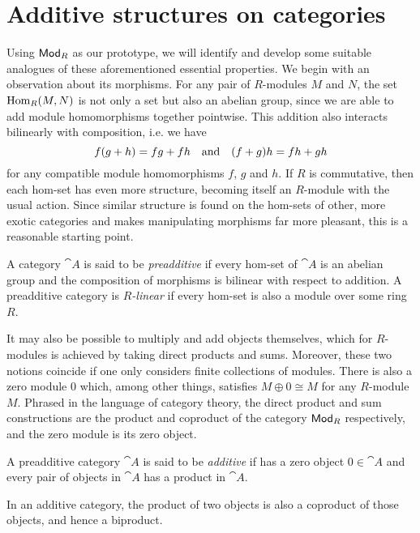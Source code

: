 \section{Additive structures on categories}

Using ${\mathsf{Mod}}_{{R}}$ as our prototype, we will identify and develop some
suitable analogues of these aforementioned essential properties.
We begin with an observation about its morphisms.
For any pair of $R$-modules $M$ and $N$, the set $\operatorname{Hom}_R(M, N)$ is
not only a set but also an abelian group, since we are able to add
module homomorphisms together pointwise.
This addition also interacts bilinearly with composition, i.e. we have
\[
  f(g + h) = fg + fh
  \quad \text{and} \quad
  (f + g)h = fh + gh
\]
for any compatible module homomorphisms $f$, $g$ and $h$.
If $R$ is commutative, then each hom-set has even more structure,
becoming itself an $R$-module with the usual action.
Since similar structure is found on the hom-sets of other, more
exotic categories and makes manipulating morphisms far more pleasant,
this is a reasonable starting point.

\begin{definition}
  A category $\cat{A}$ is said to be \emph{preadditive} if every
  hom-set of $\cat{A}$ is an abelian group and the composition of
  morphisms is bilinear with respect to addition.
  A preadditive category is \emph{$R$-linear} if every hom-set is
  also a module over some ring $R$.
\end{definition}

It may also be possible to multiply and add objects themselves, which
for $R$-modules is achieved by taking direct products and sums.
Moreover, these two notions coincide if one only considers finite
collections of modules.
There is also a zero module $0$ which, among other things, satisfies
$M \oplus 0 \cong M$ for any $R$-module $M$.
Phrased in the language of category theory, the direct product and
sum constructions are the product and coproduct of the category
${\mathsf{Mod}}_{{R}}$ respectively, and the zero module is its zero object.

\begin{definition}
  \label{def_additive_cat}
  A preadditive category $\cat{A}$ is said to be \emph{additive} if
  has a zero object $0 \in \cat{A}$ and every pair of objects in
  $\cat{A}$ has a product in $\cat{A}$.
\end{definition}

\begin{proposition}
  In an additive category, the product of two objects is also a
  coproduct of those objects, and hence a biproduct.
\end{proposition}

